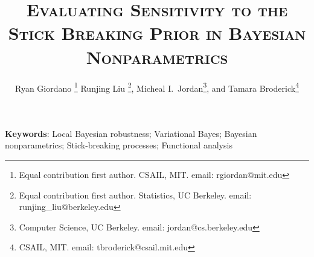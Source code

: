 \documentclass[12pt]{article}
\begin{document}

\title{\textsc{Evaluating Sensitivity to the Stick Breaking Prior in Bayesian Nonparametrics}} %



\author{
Ryan Giordano \footnote{Equal contribution first author.  CSAIL, MIT. email: rgiordan@mit.edu}
Runjing Liu \footnote{Equal contribution first author.  Statistics, UC Berkeley. email: runjing\_liu@berkeley.edu},
Micheal I.~Jordan\footnote{Computer Science, UC Berkeley. email: jordan@cs.berkeley.edu},
and Tamara Broderick\footnote{CSAIL, MIT. email: tbroderick@csail.mit.edu}\\
}

\date{\empty}
\maketitle



\begin{abstract}
    
\end{abstract}

\noindent\textbf{Keywords}:
{Local Bayesian robustness;
 Variational Bayes;
 Bayesian nonparametrics;
 Stick-breaking processes;
 Functional analysis}








\end{document}
